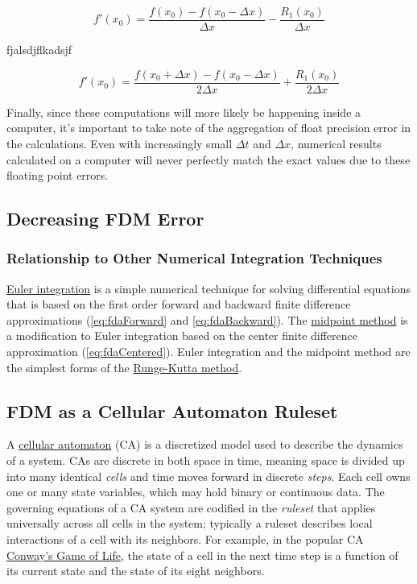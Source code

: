{ \begin{equation}
 f'(x_{0}) = \frac{f(x_{0}) - f(x_{0} - \Delta  x)}{\Delta  x} - \frac{R_{1}(x_{0})}{\Delta  x}
  \end{equation}
  
  fjalsdjflkadsjf
  
   \begin{equation}
 f'(x_{0}) = \frac{f(x_{0} + \Delta  x) - f(x_{0} - \Delta  x)}{2\Delta x} + \frac{R_{1}(x_{0})}{2\Delta  x}
  \end{equation}
  
  Finally, since these computations will more likely be happening inside a computer, it's important to take note of the aggregation of float precision error in the calculations.  Even with increasingly small $\Delta t$ and $\Delta x$, numerical results calculated on a computer will never perfectly match the exact values due to these floating point errors.
  
  \subsection{Decreasing FDM Error}
  
  \subsubsection{Relationship to Other Numerical Integration Techniques}
  
  \href{https://en.wikipedia.org/wiki/Euler_method}{Euler integration} is a simple numerical technique for solving differential equations that is based on the first order forward and backward finite difference approximations (\ref{eq:fdaForward} and \ref{eq:fdaBackward}).  The \href{https://en.wikipedia.org/wiki/Midpoint_method}{midpoint method} is a modification to Euler integration based on the center finite difference approximation (\ref{eq:fdaCentered}).  Euler integration and the midpoint method are the simplest forms of the \href{https://en.wikipedia.org/wiki/Runge%E2%80%93Kutta_methods}{Runge-Kutta method}.
    
  \subsection{FDM as a Cellular Automaton Ruleset}

A \href{https://en.wikipedia.org/wiki/Cellular_automaton}{cellular automaton} (CA) is a discretized model used to describe the dynamics of a system.  CAs are discrete in both space in time, meaning space is divided up into many identical \textit{cells} and time moves forward in discrete \textit{steps}.  Each cell owns one or many state variables, which may hold binary or continuous data.  The governing equations of a CA system are codified in the \textit{ruleset} that applies universally across all cells in the system; typically a ruleset describes local interactions of a cell with its neighbors.  For example, in the popular CA \href{https://en.wikipedia.org/wiki/Conway's_Game_of_Life}{Conway's Game of Life}, the state of a cell in the next time step is a function of its current state and the state of its eight neighbors.\\

}
